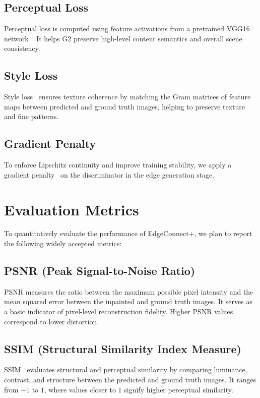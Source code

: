 \documentclass[10pt,twocolumn,letterpaper]{article}
\begin{document}
\subsection{Perceptual Loss}
Perceptual loss is computed using feature activations from a pretrained VGG16 network~\cite{johnson2016perceptual}. It helps G2 preserve high-level content semantics and overall scene consistency.

\subsection{Style Loss}
Style loss~\cite{gatys2016image} ensures texture coherence by matching the Gram matrices of feature maps between predicted and ground truth images, helping to preserve texture and fine patterns.

\subsection{Gradient Penalty}
To enforce Lipschitz continuity and improve training stability, we apply a gradient penalty~\cite{gulrajani2017improved} on the discriminator in the edge generation stage.


\section{Evaluation Metrics}

To quantitatively evaluate the performance of EdgeConnect+, we plan to report the following widely accepted metrics:

\subsection{PSNR (Peak Signal-to-Noise Ratio)}

PSNR measures the ratio between the maximum possible pixel intensity and the mean squared error between the inpainted and ground truth images. It serves as a basic indicator of pixel-level reconstruction fidelity. Higher PSNR values correspond to lower distortion.

\subsection{SSIM (Structural Similarity Index Measure)}

SSIM~\cite{wang2004image} evaluates structural and perceptual similarity by comparing luminance, contrast, and structure between the predicted and ground truth images. It ranges from $-1$ to $1$, where values closer to $1$ signify higher perceptual similarity.
\end{document}
